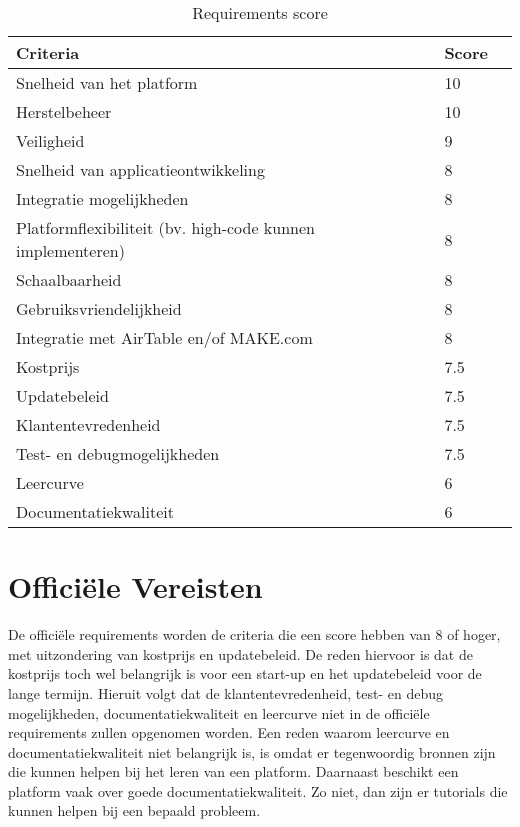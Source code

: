 \begin{table}[H]
    \centering
    \caption{Requirements score}
    \begin{tabular}{llc}
    \toprule
    Criteria & Score \\
    \midrule
    Snelheid van het platform & 10 \\
    Herstelbeheer & 10 \\
    Veiligheid & 9 \\
    Snelheid van applicatieontwikkeling & 8 \\
    Integratie mogelijkheden & 8 \\
    Platformflexibiliteit (bv. high-code kunnen implementeren) & 8 \\
    Schaalbaarheid & 8 \\
    Gebruiksvriendelijkheid & 8 \\
    Integratie met AirTable en/of MAKE.com & 8 \\
    Kostprijs & 7.5 \\
    Updatebeleid & 7.5 \\
    Klantentevredenheid & 7.5 \\
    Test- en debugmogelijkheden & 7.5 \\
    Leercurve & 6 \\
    Documentatiekwaliteit & 6 \\
   
    \bottomrule
 \end{tabular}
\end{table}

\section{Officiële Vereisten}%
\label{sec:officiële-vereisten}
De officiële requirements worden de criteria die een score hebben van 8 of hoger, 
met uitzondering van kostprijs en updatebeleid. De reden hiervoor is dat de 
kostprijs toch wel belangrijk is voor een start-up en het updatebeleid voor 
de lange termijn. Hieruit volgt dat de klantentevredenheid, test- en debug mogelijkheden, 
documentatiekwaliteit en leercurve niet in de officiële requirements zullen opgenomen worden. 
Een reden waarom leercurve en documentatiekwaliteit niet belangrijk is, is omdat er tegenwoordig bronnen 
zijn die kunnen helpen bij het leren van een platform. Daarnaast beschikt een platform vaak over goede documentatiekwaliteit. Zo niet, 
dan zijn er tutorials die kunnen helpen bij een bepaald probleem.
